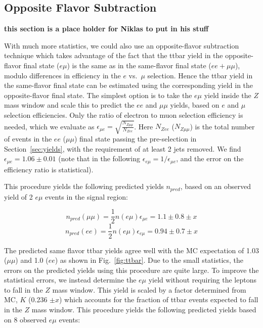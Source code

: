 


\subsection{Opposite Flavor Subtraction}
\label{sec:ofsub}


{\bf this section is a place holder for Niklas to put in his stuff}

With much more statistics, we could also use an opposite-flavor subtraction
technique which takes advantage of the fact that the ttbar yield in the opposite-flavor final state ($e\mu$) is the same as in the same-flavor final state
($ee+\mu\mu$), modulo differences in efficiency in the $e$ vs.\ $\mu$ selection. Hence the ttbar yield in the same-flavor final state can be estimated
using the corresponding yield in the opposite-flavor final state. The simplest option is to take the $e\mu$ yield inside the $Z$ mass window and scale this
to predict the $ee$ and $\mu\mu$ yields, based on $e$ and $\mu$ selection efficiencies.
Only the ratio of electron to muon selection efficiency is needed, which we evaluate as $\epsilon_{\mu e} = \sqrt{\frac{N_{Z\mu\mu}}{N_{Zee}}}$. 
Here $N_{Zee}$ ($N_{Z\mu\mu}$) is the total number of events in the $ee$ ($\mu\mu$) final state passing the pre-selection in Section~\ref{sec:yields},
with the requirement of at least 2 jets removed. We find $\epsilon_{\mu e}=1.06 \pm 0.01$ (note that in the following $\epsilon_{e\mu} = 1/\epsilon_{\mu e}$, and the error on the efficiency ratio is statistical).

This procedure yields the following predicted yields $n_{pred}$, based on an observed yield of 2 $e\mu$ events in the signal region:

\begin{equation}
n_{pred}(\mu\mu) = \frac{1}{2}n(e\mu)\epsilon_{\mu e} = 1.1 \pm 0.8 \pm x
\end{equation}
\begin{equation}
n_{pred}(ee)     = \frac{1}{2}n(e\mu)\epsilon_{e\mu} = 0.94 \pm 0.7 \pm x
\end{equation}

The predicted same flavor ttbar yields agree well with the MC expectation of 1.03 ($\mu\mu$) %
and 1.0 ($ee$) %
as shown in Fig.~\ref{fig:ttbar}. %
Due to the small statistics, the errors on the predicted yields using this procedure are quite large.
To improve the statistical errors, we instead determine the $e\mu$ yield without requiring the leptons to fall in the $Z$ mass window. 
This yield is scaled by a factor determined from MC, $K$ (0.236 $\pm x$) %
which accounts for the fraction of ttbar events expected to fall in the $Z$ mass window. This procedure yields the following
predicted yields based on 8 observed $e\mu$ events:

